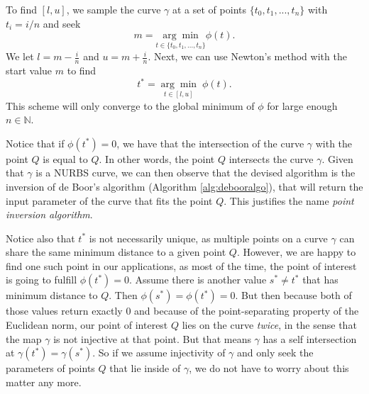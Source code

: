 \documentclass[a4paper, 11pt]{report}
\theoremstyle{definition}
\renewcommand{\emph}[1]{\textit{#1}}
\begin{document}
	To find $[l,u]$, we sample the curve $\gamma$ at a set of points $\{t_0, t_1, ..., t_n\}$ with $t_i = i/n$ and seek
		$$ m = \underset{t\in\{t_0, t_1, ..., t_n\}}{\arg\min} \phi(t). $$
	We let $l = m - \frac{i}{n}$ and $u = m + \frac{i}{n}$. Next, we can use Newton's method with the start value $m$ to find
		$$ t^* = \underset{t\in[l,u]}{\arg\min}\;\phi(t). $$
	This scheme will only converge to the global minimum of $\phi$ for large enough $n \in \mathbb{N}$.

	Notice that if $\phi(t^*) = 0$, we have that the intersection of the curve $\gamma$ with the point $Q$ is equal to $Q$. In other words, the point $Q$ intersects the curve $\gamma$. Given that $\gamma$ is a NURBS curve, we can then observe that the devised algorithm is the inversion of de Boor's algorithm (Algorithm \ref{alg:debooralgo}), that will return the input parameter of the curve that fits the point $Q$. This justifies the name \emph{point inversion algorithm}.

	Notice also that $t^*$ is not necessarily unique, as multiple points on a curve $\gamma$ can share the same minimum distance to a given point $Q$. However, we are happy to find one such point in our applications, as most of the time, the point of interest is going to fulfill $\phi(t^*) = 0$. Assume there is another value $s^* \neq t^*$ that has minimum distance to $Q$. Then $\phi(s^*) = \phi(t^*) = 0$. But then because both of those values return exactly $0$ and because of the point-separating property of the Euclidean norm, our point of interest $Q$ lies on the curve \emph{twice}, in the sense that the map $\gamma$ is not injective at that point. But that means $\gamma$ has a self intersection at $\gamma(t^*) = \gamma(s^*)$. So if we assume injectivity of $\gamma$ and only seek the parameters of points $Q$ that lie inside of $\gamma$, we do not have to worry about this matter any more.
\end{document}
